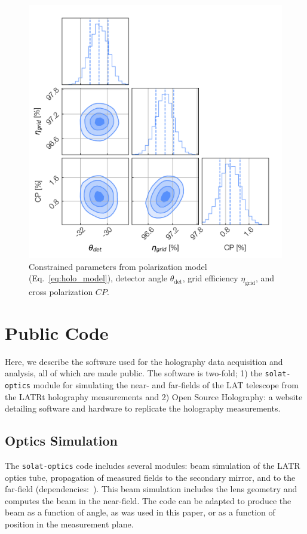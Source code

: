 \begin{figure}[ht]
    \centering
    \includegraphics[height = .7\textwidth]{Figures/holo_crosspol_params.pdf}
    \caption{Constrained parameters from polarization model (Eq.~\ref{eq:holo_model}), detector angle $\theta_{\text{det}}$, grid efficiency $\eta_{\text{grid}}$, and cross polarization $CP$.}
    \label{fig:holo_crosspol_params}
\end{figure}

\section{Public Code}
\label{sec:solat_code}
Here, we describe the software used for the holography data acquisition and analysis, all of which are made public.  The software is two-fold; 1) the \verb|solat-optics| module for simulating the near- and far-fields of the LAT telescope from the LATRt holography measurements and 2) Open Source Holography: a website detailing software and hardware to replicate the holography measurements.

\subsection{Optics Simulation}
The \verb|solat-optics| code includes several modules: beam simulation of the LATR optics tube, propagation of measured fields to the secondary mirror, and to the far-field (dependencies:~\cite{2020NumPy-Array,2020SciPy-NMeth,hunter2007matplotlib,reback2020pandas,mpiPython,tqdm}).  This beam simulation includes the lens geometry and computes the beam in the near-field.  The code can be adapted to produce the beam as a function of angle, as was used in this paper, or as a function of position in the measurement plane.  

